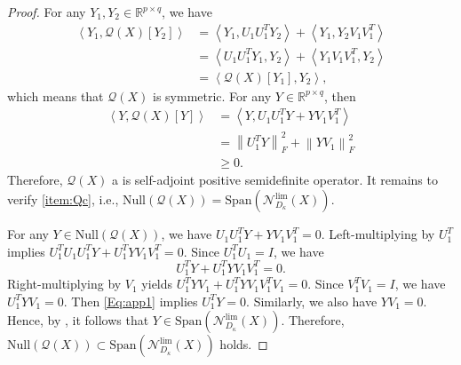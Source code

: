 \documentclass[11pt,a4paper,reqno]{amsart}
\begin{document}
{\begin{proof}
For any $Y_1, Y_2\in \mathbb R^{p\times q}$, we have
\begin{equation*}
    \begin{aligned}
        \left< Y_1, \mathcal Q(X)[Y_2] \right>&= \left< Y_1, U_1U_1^TY_2\right>+\left< Y_1, Y_2V_1V_1^T\right>\\
        & = \left< U_1U_1^TY_1, Y_2 \right>+\left< Y_1V_1V_1^T, Y_2\right>\\
        & = \left < \mathcal Q(X)[Y_1], Y_2 \right>,
    \end{aligned}
\end{equation*}
which means that $\mathcal Q(X)$ is symmetric. For any $Y\in \mathbb R^{p\times q}$, then
\begin{equation*}
    \begin{aligned}
        \left< Y, \mathcal Q(X)[Y] \right>&=\left< Y, U_1U_1^TY+YV_1V_1^T \right>\\
        & = \left\|U_1^TY\right\|_F^2+ \left\| YV_1\right\|_F^2\\
        & \geq 0.
    \end{aligned}
\end{equation*}
Therefore, $\mathcal Q(X)$ a is self-adjoint positive semidefinite operator. It remains to verify  \ref{item:Qc}, i.e., $\text{Null} \left( \mathcal Q(X)\right ) = \text{Span} \left( \mathcal N^{\text{lim}}_{D_{\kappa}}(X)\right)$. 

For any $Y\in \text{Null} \left( \mathcal Q(X)\right )$, we have $U_1U_1^TY+YV_1V_1^T=0$. Left-multiplying by $U_1^T$ implies $U_1^TU_1U_1^TY+U_1^TYV_1V_1^T=0$. Since $U_1^TU_1=I$, we have 
\begin{equation}\label{Eq:app1}
U_1^TY+U_1^TYV_1V_1^T=0.
\end{equation}
Right-multiplying by $V_1$ yields 
$U_1^TYV_1+U_1^TYV_1V_1^TV_1=0$. Since $V_1^TV_1=I$, we have $U_1^TYV_1=0$. Then \eqref{Eq:app1} implies
$U_1^TY=0$. Similarly, we also have $YV_1=0$. Hence, by , it follows that $Y \in \text{Span}\left( \mathcal N^{\text{lim}}_{D_{\kappa}}(X)\right)$. Therefore, $\text{Null} \left( \mathcal Q(X)\right ) \subset \text{Span}\left( \mathcal N^{\text{lim}}_{D_{\kappa}}(X)\right) $ holds. 


\end{proof}}
\end{document}
